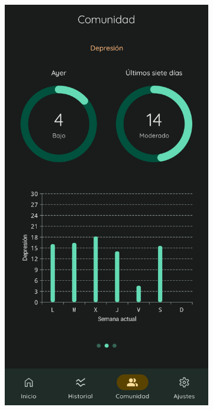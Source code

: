             \begin{figure}[htbp]
                \centering
                \begin{subfigure}[c]{0.4\textwidth}
                    \centering
                    \includegraphics[width=1\textwidth]{figures/pruebas/comunidad/Comunidad depresion.png}

\end{subfigure}
\end{figure}
